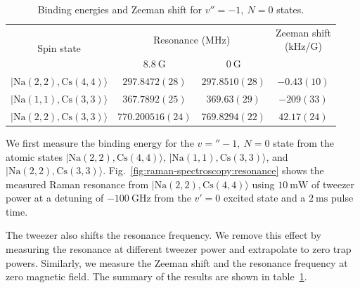 \begin{table}
  \centering
  \caption[Binding energies for $v''=-1,\ N=0$ states]{
    Binding energies and Zeeman shift for $v''=-1,\ N=0$ states.
    \label{table:raman-spectroscopy:n0}}
  \begin{tabular}{|c|c|c|c|}
    \hline
    \multirow{2}{*}{Spin state}&\multicolumn{2}{c|}{Resonance (MHz)}&\multirowcell{2}{Zeeman shift\\(kHz/G)}\\\cline{2-3}
    {}&$8.8~\mathrm{G}$&$0~\mathrm{G}$&\\\hline
    $|\mathrm{Na(2, 2),Cs(4, 4)}\rangle$&$297.8472(28)$&$297.8510(28)$&$-0.43(10)$\\\hline
    $|\mathrm{Na(1, 1),Cs(3, 3)}\rangle$&$367.7892(25)$&$369.63(29)$&$-209(33)$\\\hline
    $|\mathrm{Na(2, 2),Cs(3, 3)}\rangle$&$770.200516(24)$&$769.8294(22)$&$42.17(24)$\\\hline
  \end{tabular}
\end{table}

We first measure the binding energy for the $v=''-1,\ N=0$ state
from the atomic states $|\mathrm{Na(2, 2),Cs(4, 4)}\rangle$, $|\mathrm{Na(1, 1),Cs(3, 3)}\rangle$,
and $|\mathrm{Na(2, 2),Cs(3, 3)}\rangle$.
Fig.~\ref{fig:raman-spectroscopy:resonance} shows the measured Raman resonance from
$|\mathrm{Na(2, 2),Cs(4, 4)}\rangle$ using $10~\mathrm{mW}$ of tweezer power at a detuning of
$-100~\mathrm{GHz}$ from the $v'=0$ excited state and a $2~\mathrm{ms}$ pulse time.

The tweezer also shifts the resonance frequency.
We remove this effect by measuring the resonance at different tweezer power
and extrapolate to zero trap powers.
Similarly, we measure the Zeeman shift and the resonance frequency at zero magnetic field.
The summary of the results are shown in table~\ref{table:raman-spectroscopy:n0}.

